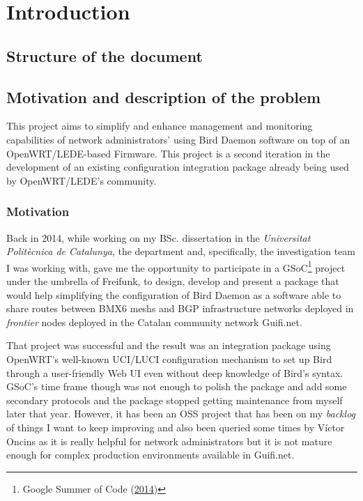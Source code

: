 \chapter{Introduction}
\label{ch:introduction}
\pagestyle{headings}


\cite{nitos}

\section{Structure of the document}



\section{Motivation and description of the problem}
\label{sec:bdotp}
This project aims to simplify and enhance management and monitoring capabilities of network administrators' using Bird Daemon software on top of an OpenWRT/LEDE-based Firmware. This project is a second iteration in the development of an existing configuration integration package already being used by OpenWRT/LEDE's community.

\subsection{Motivation}
Back in 2014, while working on my BSc. dissertation in the \textit{Universitat Politècnica de Catalunya}, the department and, specifically, the investigation team I was working with, gave me the opportunity to participate in a GSoC\footnote{Google Summer of Code (\href{https://www.google-melange.com/archive/gsoc/2014/orgs/freifunk/projects/eloicaso.html}{2014})} project under the umbrella of Freifunk, to design, develop and present  a package that would help simplifying the configuration of Bird Daemon as a software able to share routes between BMX6 meshs and BGP infrastructure networks deployed in \textit{frontier} nodes deployed in the Catalan community network Guifi.net.

That project was successful and the result was an integration package using OpenWRT's well-known UCI/LUCI configuration mechanism to set up Bird through a user-friendly Web UI even without deep knowledge of Bird's syntax. GSoC's time frame though was not enough to polish the package and add some secondary protocols and the package stopped getting maintenance from myself later that year. However, it has been an OSS project that has been on my \textit{backlog} of things I want to keep improving and also been queried some times by Víctor Oncins as it is really helpful for network administrators but it is not mature enough for complex production environments available in Guifi.net.

